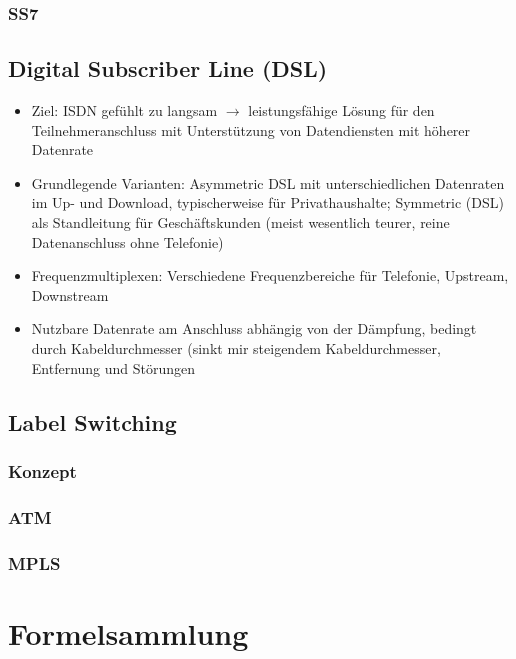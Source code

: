 \subsubsection{SS7}


\subsection{Digital Subscriber Line (DSL)}
\begin{itemize}
	\item Ziel: ISDN gefühlt zu langsam \(\rightarrow\) leistungsfähige Lösung für den Teilnehmeranschluss mit Unterstützung von Datendiensten mit höherer Datenrate
	\item Grundlegende Varianten: Asymmetric DSL mit unterschiedlichen Datenraten im Up- und Download, typischerweise für Privathaushalte; Symmetric (DSL) als Standleitung für Geschäftskunden (meist wesentlich teurer, reine Datenanschluss ohne Telefonie)
	\item Frequenzmultiplexen: Verschiedene Frequenzbereiche für Telefonie, Upstream, Downstream
	\item Nutzbare Datenrate am Anschluss abhängig von der Dämpfung, bedingt durch Kabeldurchmesser (sinkt mir steigendem Kabeldurchmesser, Entfernung und Störungen
\end{itemize}


\subsection{Label Switching}

\subsubsection{Konzept}

\subsubsection{ATM}

\subsubsection{MPLS}



\section{Formelsammlung}
